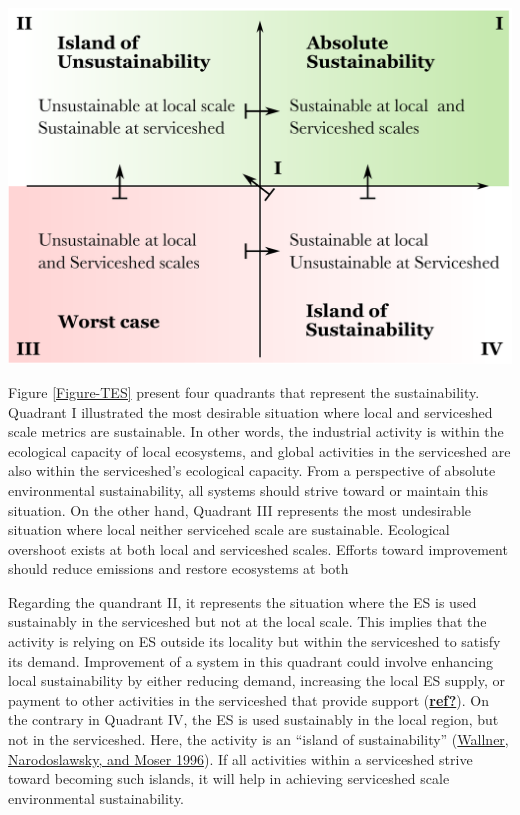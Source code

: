 \documentclass[
  14pt,
]{extarticle}
\begin{document}
\includegraphics[width=1\linewidth]{Figures/Quadrantes-sustainability}

Figure \ref{Figure-TES} present four quadrants that represent the sustainability.
Quadrant I illustrated the most desirable situation where local and serviceshed scale metrics are sustainable.
In other words, the industrial activity is within the ecological capacity of local ecosystems, and global activities in the serviceshed are also within the serviceshed's ecological capacity.
From a perspective of absolute environmental sustainability, all systems should strive toward or maintain this situation.
On the other hand, Quadrant III represents the most undesirable situation where local neither servicehed scale are sustainable.
Ecological overshoot exists at both local and serviceshed scales.
Efforts toward improvement should reduce emissions and restore ecosystems at both

Regarding the quandrant II, it represents the situation where the ES is used sustainably in the serviceshed but not at the local scale.
This implies that the activity is relying on ES outside its locality but within the serviceshed to satisfy its demand.
Improvement of a system in this quadrant could involve enhancing local sustainability by either reducing demand, increasing the local ES supply, or payment to other activities in the serviceshed that provide support (\protect\hyperlink{ref-ref}{\textbf{ref?}}).
On the contrary in Quadrant IV, the ES is used sustainably in the local region, but not in the serviceshed.
Here, the activity is an ``island of sustainability'' (\protect\hyperlink{ref-Wallner1996}{Wallner, Narodoslawsky, and Moser 1996}).
If all activities within a serviceshed strive toward becoming such islands, it will help in achieving serviceshed scale environmental sustainability.
\end{document}
